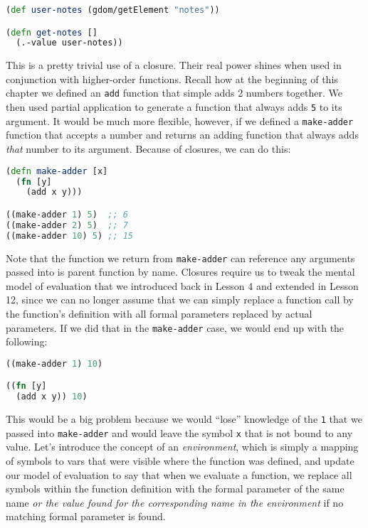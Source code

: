 \documentclass[10pt,twoside,openright]{memoir}
\begin{document}
\begin{lstlisting}[language=Clojure]
(def user-notes (gdom/getElement "notes"))

(defn get-notes []
  (.-value user-notes))
\end{lstlisting}

This is a pretty trivial use of a closure. Their real power shines when
used in conjunction with higher-order functions. Recall how at the
beginning of this chapter we defined an \texttt{add} function that
simple adds 2 numbers together. We then used partial application to
generate a function that always adds \texttt{5} to its argument. It
would be much more flexible, however, if we defined a
\texttt{make-adder} function that accepts a number and returns an adding
function that always adds \emph{that} number to its argument. Because of
closures, we can do this:

\begin{lstlisting}[language=Clojure]
(defn make-adder [x]
  (fn [y]
    (add x y)))

((make-adder 1) 5)  ;; 6
((make-adder 2) 5)  ;; 7
((make-adder 10) 5) ;; 15
\end{lstlisting}

Note that the function we return from \texttt{make-adder} can reference
any arguments passed into is parent function by name. Closures require
us to tweak the mental model of evaluation that we introduced back in
Lesson 4 and extended in Lesson 12, since we can no longer assume that we can simply replace a function
call by the function's definition with all formal parameters replaced by
actual parameters. If we did that in the \texttt{make-adder} case, we
would end up with the following:

\begin{lstlisting}[language=Clojure]
((make-adder 1) 10)

((fn [y]
  (add x y)) 10)
\end{lstlisting}

This would be a big problem because we would ``lose'' knowledge of the
\texttt{1} that we passed into \texttt{make-adder} and would leave the
symbol \texttt{x} that is not bound to any value. Let's introduce the
concept of an \emph{environment}, which is simply a mapping of symbols
to vars that were visible where the function was defined, and update our
model of evaluation to say that when we evaluate a function, we replace
all symbols within the function definition with the formal parameter of
the same name \emph{or the value found for the corresponding name in the
environment} if no matching formal parameter is found.
\end{document}
